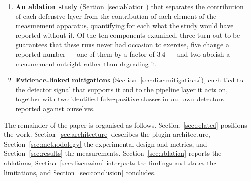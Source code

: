 \begin{enumerate}
\item \textbf{An ablation study} (Section~\ref{sec:ablation}) that
separates the contribution of each defensive layer from the contribution
of each element of the measurement apparatus, quantifying for each what
the study would have reported without it. Of the ten components examined,
three turn out to be guarantees that these runs never had occasion to
exercise, five change a reported number --- one of them by a factor of
$3.4$ --- and two abolish a measurement outright rather than degrading
it.

\item \textbf{Evidence-linked mitigations} (Section~\ref{sec:disc:mitigations}),
each tied to the detector signal that supports it and to the pipeline
layer it acts on, together with two identified false-positive classes in
our own detectors reported against ourselves.
\end{enumerate}

The remainder of the paper is organised as follows.
Section~\ref{sec:related} positions the work.
Section~\ref{sec:architecture} describes the plugin architecture,
Section~\ref{sec:methodology} the experimental design and metrics, and
Section~\ref{sec:results} the measurements.
Section~\ref{sec:ablation} reports the ablations,
Section~\ref{sec:discussion} interprets the findings and states the
limitations, and Section~\ref{sec:conclusion} concludes.
